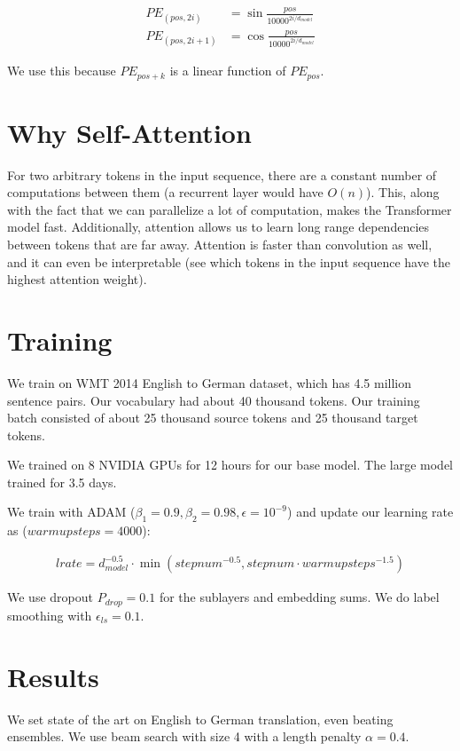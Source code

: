 \documentclass[a4paper]{article}
\begin{document}
\begin{align}
  PE_{(pos, 2i)} &= \sin{\frac{pos}{10000^{2i/d_{model}}}} \\
  PE_{(pos, 2i+1)} &= \cos{\frac{pos}{10000^{2i/d_{model}}}}
\end{align}

We use this because $PE_{pos + k}$ is a linear function of $PE_{pos}$.

\section{Why Self-Attention}
For two arbitrary tokens in the input sequence, there are a constant number
of computations between them (a recurrent layer would have $O(n)$). This,
along with the fact that we can parallelize a lot of computation, makes
the Transformer model fast. Additionally, attention allows us to learn long
range dependencies between tokens that are far away. Attention is faster than
convolution as well, and it can even be interpretable (see which tokens in the
input sequence have the highest attention weight).

\section{Training}
We train on WMT 2014 English to German dataset, which has 4.5 million sentence
pairs. Our vocabulary had about 40 thousand tokens. Our training batch consisted
of about 25 thousand source tokens and 25 thousand target tokens.

We trained on 8 NVIDIA GPUs for 12 hours for our base model. The large model
trained for 3.5 days.

We train with ADAM ($\beta_1 = 0.9, \beta_2 = 0.98, \epsilon = 10^{-9}$) and
update our learning rate as ($warmupsteps = 4000$):

\begin{align}
  lrate = d_{model}^{-0.5} \cdot \min{(stepnum^{-0.5}, stepnum \cdot warmupsteps^{-1.5})}
\end{align}

We use dropout $P_{drop} = 0.1$ for the sublayers and embedding sums. We do
label smoothing with $\epsilon_{ls} = 0.1$.

\section{Results}
We set state of the art on English to German translation, even beating
ensembles. We use beam search with size 4 with a length penalty $\alpha = 0.4$.
\end{document}
